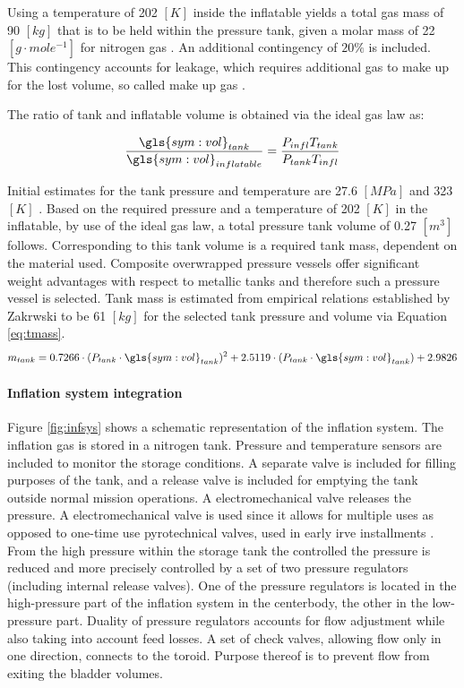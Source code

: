 Using a temperature of 202 $[K]$ inside the inflatable yields a total gas mass of 90 $[kg]$ that is to be held within the pressure tank, given a molar mass of 22 $[g\cdot mole^{-1}]$ for nitrogen gas \cite{Samareh2011}. An additional contingency of $20\%$ is included. This contingency accounts for leakage, which requires additional gas to make up for the lost volume, so called make up gas \cite{Jenkins2001}.

The ratio of tank and inflatable volume is obtained via the ideal gas law as:

\begin{equation}
\frac{\gls{sym:vol}_{tank}}{\gls{sym:vol}_{inflatable}} = \frac{P_{infl}T_{tank}}{P_{tank}T_{infl}}
\label{eq:volratio}
\end{equation}

Initial estimates for the tank pressure and temperature are 27.6 $[MPa]$ and 323 $[K]$ \cite[p.545]{Wertz2011}. Based on the required pressure and a temperature of 202 $[K]$ in the inflatable, by use of the ideal gas law, a total pressure tank volume of 0.27 $[m^{3}]$ follows. Corresponding to this tank volume is a required tank mass, dependent on the material used. Composite overwrapped pressure vessels offer significant weight advantages with respect to metallic tanks and therefore such a pressure vessel is selected. Tank mass is estimated from empirical relations established by Zakrwski \cite[p.546]{Wertz2011} to be 61 $[kg]$ for the selected tank pressure and volume via Equation \ref{eq:tmass}.
\begin{equation}
m_{tank} = 0.7266 \cdot (P_{tank} \cdot \gls{sym:vol}_{tank})^{2} + 2.5119 \cdot (P_{tank} \cdot \gls{sym:vol}_{tank}) + 2.9826
\label{eq:tmass}
\end{equation}

\paragraph{Inflation system integration}

Figure \ref{fig:infsys} shows a schematic representation of the inflation system. The inflation gas is stored in a nitrogen tank. Pressure and temperature sensors are included to monitor the storage conditions. A separate valve is included for filling purposes of the tank, and a release valve is included for emptying the tank outside normal mission operations. A electromechanical valve releases the pressure. A electromechanical valve is used since it allows for multiple uses as opposed to one-time use pyrotechnical valves, used in early \gls{irve} installments \cite{Hughes2005}. From the high pressure within the storage tank the controlled the pressure is reduced and more precisely controlled by a set of two pressure regulators (including internal release valves). One of the pressure regulators is located in the high-pressure part of the inflation system in the centerbody, the other in the low-pressure part. Duality of pressure regulators accounts for flow adjustment while also taking into account feed losses. A set of check valves, allowing flow only in one direction, connects to the toroid. Purpose thereof is to prevent flow from exiting the bladder volumes. 


